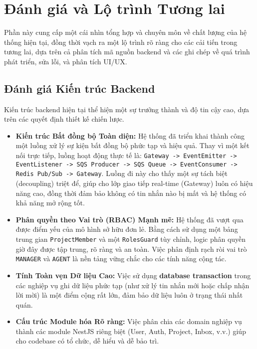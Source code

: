 \section{Đánh giá và Lộ trình Tương lai}
\label{sec:assessment}

Phần này cung cấp một cái nhìn tổng hợp và chuyên môn về chất lượng của hệ thống hiện tại, đồng thời vạch ra một lộ trình rõ ràng cho các cải tiến trong tương lai, dựa trên cả phân tích mã nguồn backend và các ghi chép về quá trình phát triển, sửa lỗi, và phân tích UI/UX.

\subsection{Đánh giá Kiến trúc Backend}
\label{subsec:backend-assessment}

Kiến trúc backend hiện tại thể hiện một sự trưởng thành và độ tin cậy cao, dựa trên các quyết định thiết kế chiến lược.

\begin{itemize}
    \item \textbf{Kiến trúc Bất đồng bộ Toàn diện:}
    Hệ thống đã triển khai thành công một luồng xử lý sự kiện bất đồng bộ phức tạp và hiệu quả. Thay vì một kết nối trực tiếp, luồng hoạt động thực tế là: \texttt{Gateway -> EventEmitter -> EventListener -> SQS Producer -> SQS Queue -> EventConsumer -> Redis Pub/Sub -> Gateway}. Luồng đi này cho thấy một sự tách biệt (decoupling) triệt để, giúp cho lớp giao tiếp real-time (Gateway) luôn có hiệu năng cao, đồng thời đảm bảo không có tin nhắn nào bị mất và hệ thống có khả năng mở rộng tốt.

    \item \textbf{Phân quyền theo Vai trò (RBAC) Mạnh mẽ:}
    Hệ thống đã vượt qua được điểm yếu của mô hình sở hữu đơn lẻ. Bằng cách sử dụng một bảng trung gian \texttt{ProjectMember} và một \texttt{RolesGuard} tùy chỉnh, logic phân quyền giờ đây được tập trung, rõ ràng và an toàn. Việc phân định rạch ròi vai trò \texttt{MANAGER} và \texttt{AGENT} là nền tảng vững chắc cho các tính năng cộng tác.

    \item \textbf{Tính Toàn vẹn Dữ liệu Cao:}
    Việc sử dụng \textbf{database transaction} trong các nghiệp vụ ghi dữ liệu phức tạp (như xử lý tin nhắn mới hoặc chấp nhận lời mời) là một điểm cộng rất lớn, đảm bảo dữ liệu luôn ở trạng thái nhất quán.

    \item \textbf{Cấu trúc Module hóa Rõ ràng:}
    Việc phân chia các domain nghiệp vụ thành các module NestJS riêng biệt (User, Auth, Project, Inbox, v.v.) giúp cho codebase có tổ chức, dễ hiểu và dễ bảo trì.
\end{itemize}

